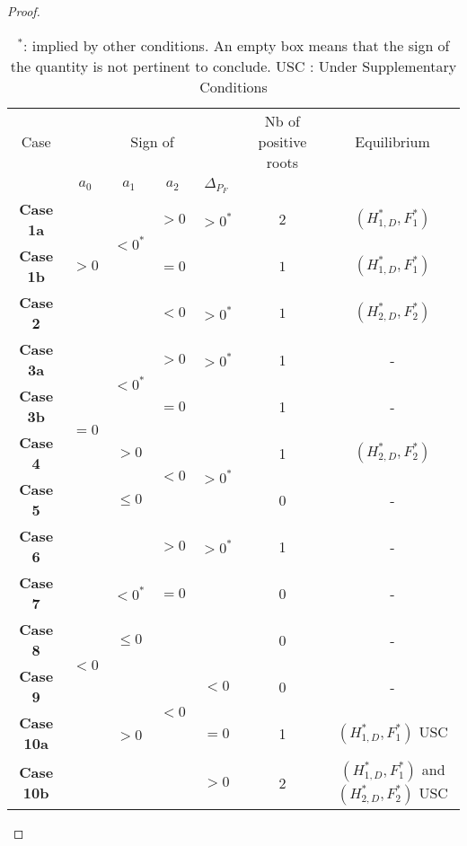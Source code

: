 \documentclass{article}
\begin{document}
\begin{proof}
\begin{table}[!ht]
\centering
\begin{tabular}{c|c|c|c|c|c|c}
 Case & \multicolumn{4}{c|}{Sign of} & Nb of positive roots & Equilibrium \\
 & $a_0$ & $a_1$ & $a_2$ & $\Delta_{P_F}$ && \\
\hline
\textbf{Case 1a} & \multirow{3}{*}{$>0$} & \multirow{2}{*}{$< 0^*$} & $> 0$ & $>0^*$ & $2$ & $(H_{1,D}^*,F_1^*)$ \\
\cline{4-7}
\textbf{Case 1b} &  &  & $= 0$ &  & $1$ & $(H_{1,D}^*,F_1^*)$ \\
\cline{3-7}
\textbf{Case 2} &  &  & $ < 0$ & $>0^*$ & $1$ & $(H_{2,D}^*,F_2^*)$ \\
\hline
\textbf{Case 3a}  & \multirow{4}{*}{$= 0$} & \multirow{2}{*}{$< 0^*$}& $> 0$ & $>0^*$ & 1 & -
\\
\cline{4-7}
\textbf{Case 3b}  & & & $=0$ &  & 1 & - \\
\cline{3-7}
\textbf{Case 4} & &$ > 0$ & \multirow{2}{*}{$ < 0$}& \multirow{2}{*}{$ > 0^*$} & 1 & $(H_{2,D}^*,F_2^*)$ \\
\cline{3-3} \cline{6-7}
\textbf{Case 5} & &$ \leq 0$ & &  & 0 & -
\\
\hline
\textbf{Case 6}  & \multirow{6}{*}{$ < 0$} & & $> 0$ & $>0^*$ & 1 & -
\\
\cline{3-7}
\textbf{Case 7} &  & $<0^*$ & $ = 0$ &  & 0 & - \\
\cline{3-7}
\textbf{Case 8} &  & $\leq0$ & \multirow{4}{*}{$ < 0$} &  & 0 & - \\
\cline{3-3} \cline{5-7}
\textbf{Case 9} &  & \multirow{3}{*}{$ > 0$} & &  $<0$& 0 & - \\
\cline{5-7}
\textbf{Case 10a} &  &  & &  $ = 0$& 1 & $(H_{1,D}^*,F_1^*)$ USC \\
\cline{5-7}
\textbf{Case 10b} &  &  & &  $ > 0$& 2 & $(H_{1,D}^*,F_1^*)$ and $(H_{2,D}^*,F_2^*)$ USC\\
\end{tabular}
\caption{\centering $^*$: implied by other conditions. \newline An empty box means that the sign of the quantity is not pertinent to conclude. \newline USC : Under Supplementary Conditions}
\label{table2}
\end{table}



\end{proof}
\end{document}
